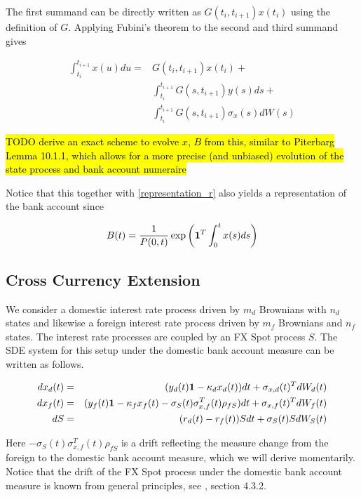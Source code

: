 \documentclass{amsart}
\theoremstyle{plain}
\numberwithin{equation}{section}
\begin{document}
The first summand can be directly written as $G(t_i, t_{i+1}) x(t_i)$ using the definition of $G$. Applying Fubini's
theorem to the second and third summand gives

\begin{equation}
  \begin{split}
    \int_{t_i}^{t_{i+1}} x(u) du =& G(t_i, t_{i+1}) x(t_i) + \\
     & \int_{t_i}^{t_{i+1}} G(s,t_{i+1}) y(s) ds + \\
     & \int_{t_i}^{t_{i+1}} G(s,t_{i+1}) \sigma_x(s) dW(s)
  \end{split}
\end{equation}

\hl{TODO derive an exact scheme to evolve $x$, $B$ from this, similar to Piterbarg Lemma 10.1.1, which allows for a more
  precise (and unbiased) evolution of the state process and bank account numeraire}

Notice that this together with \ref{representation_r} also yields a representation of the bank account since

\begin{equation}\label{representation_B}
B(t) = \frac{1}{P(0,t)} \exp \left( {\bf 1}^T \int_0^t x(s) ds \right)
\end{equation}

\subsection{Cross Currency Extension}

We consider a domestic interest rate process driven by $m_d$ Brownians with $n_d$ states and likewise a foreign interest
rate process driven by $m_f$ Brownians and $n_f$ states. The interest rate processes are coupled by an FX Spot process
$S$. The SDE system for this setup under the domestic bank account measure can be written as follows.

\begin{eqnarray}
  dx_d(t) & = & (y_d(t)  {\bf 1} - \kappa_d x_d(t)) dt + \sigma_{x,d}(t)^T dW_d(t) \\
  dx_f(t) & = & (y_f(t)  {\bf 1} - \kappa_f x_f(t) - \sigma_S(t) \sigma_{x,f}^T(t) \rho_{fS} ) dt + \sigma_{x,f}(t)^T dW_f(t) \\
  dS &=& (r_d(t) - r_f(t)) S dt + \sigma_S(t) S dW_S(t)
\end{eqnarray}

Here $- \sigma_S(t) \sigma_{x,f}^T(t) \rho_{fS}$ is a drift reflecting the measure change from the foreign to the domestic
bank account measure, which we will derive momentarily. Notice that the drift of the FX Spot process under the domestic
bank account measure is known from general principles, see \cite{Andersen_Piterbarg_2010}, section 4.3.2.
\end{document}
